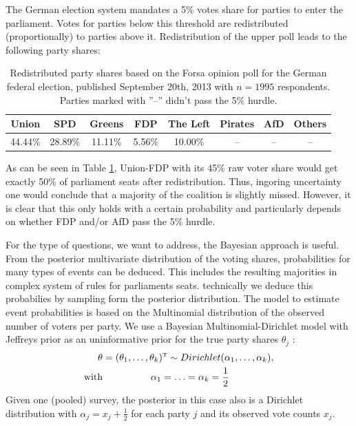 \documentclass[smallcondensed]{svjour3}     %
\newcommand{\T}{\mathrm{\scriptscriptstyle T}}
\begin{document}
The German election system mandates a 5\% votes share for parties to enter the parliament.
Votes for parties below this threshold are redistributed (proportionally) to parties
above it. Redistribution of the upper poll leads to the following party shares:

\begin{table}[!ht]\centering
\caption{Redistributed party shares based on the Forsa opinion poll for the German federal election, published September 20th, 2013 with $n=1995$ respondents. Parties marked with ''--'' didn't pass the 5\% hurdle.
\label{tab_fdp_redist}
}
\medskip
\begin{tabular}{cccccccc}
\toprule[0.09 em]
Union & SPD & Greens & FDP & The Left & Pirates & AfD & Others \\
\midrule
44.44\% & 28.89\% & 11.11\% & 5.56\% & 10.00\% & -- & -- & -- \\
\bottomrule[0.09 em]
\end{tabular}
\end{table}

As can be seen in Table \ref{tab_fdp_redist}, Union-FDP with its 45\% raw voter share would get exactly 50\% of parliament seats after redistribution. Thus, ingoring uncertainty one would conclude that a majority of the coalition is slightly missed. However, it is clear that this only holds with a certain probability and particularly depends on whether FDP and/or AfD pass the 5\% hurdle.

For the type of questions, we want to address, the Bayesian approach is useful. From the posterior multivariate distribution of the voting shares, probabilities for many types of events can be deduced. This includes the resulting majorities in complex system of rules for parliaments seats. technically we deduce this probabilies by sampling form the posterior distribution.  The model to estimate event probabilities is based on the Multinomial distribution of the observed
number of voters per party. We use a Bayesian Multinomial-Dirichlet model
with Jeffreys prior as an uninformative prior for the true party shares
$\theta_j$ \citep{gelman_2013}:
\begin{equation}
\begin{aligned}
\boldmath{\theta} &= (\theta_1,\ldots,\theta_k)^\T \sim Dirichlet(\alpha_1,\ldots,\alpha_k), \\
\text{with} &\ \ \ \ \ \ \ \ \ \ \ \ \ \ \ \alpha_1 = \ldots = \alpha_k = \frac{1}{2}
\end{aligned}
\end{equation}
Given one (pooled) survey, the posterior in this case also is a Dirichlet distribution
with $\alpha_j = x_j + \frac{1}{2}$ for each party $j$ and its observed
vote counts $x_j$.
\end{document}
